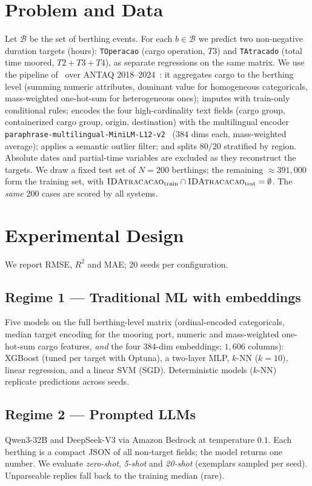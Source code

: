 \documentclass[kdmile,a4paper]{kdmile}
\begin{document}
\section{Problem and Data}
\label{sec:data}
Let $\mathcal{B}$ be the set of berthing events. For each $b\in\mathcal{B}$ we predict two non-negative duration targets (hours): \texttt{TOperacao} (cargo operation, $T3$) and \texttt{TAtracado} (total time moored, $T2{+}T3{+}T4$), as separate regressions on the same matrix. We use the pipeline of~\cite{pacheco2026pitfalls} over ANTAQ 2018--2024~\cite{antaq_data}: it aggregates cargo to the berthing level (summing numeric attributes, dominant value for homogeneous categoricals, mass-weighted one-hot-sum for heterogeneous ones); imputes with train-only conditional rules; encodes the four high-cardinality text fields (cargo group, containerized cargo group, origin, destination) with the multilingual encoder \texttt{paraphrase-\allowbreak multilingual-\allowbreak MiniLM-\allowbreak L12-v2}~\cite{reimers2019sbert} ($384$ dims each, mass-weighted average); applies a semantic outlier filter; and splits 80/20 stratified by region. Absolute dates and partial-time variables are excluded as they reconstruct the targets. We draw a fixed test set of $N{=}200$ berthings; the remaining $\approx\!391{,}000$ form the training set, with $\textsc{IDAtracacao}_{\text{train}}\cap\textsc{IDAtracacao}_{\text{test}}=\emptyset$. The \emph{same} 200 cases are scored by all systems.

\section{Experimental Design}
\label{sec:design}
We report RMSE, $R^2$ and MAE; 20 seeds per configuration.

\subsection{Regime 1 --- Traditional ML with embeddings}
Five models on the full berthing-level matrix (ordinal-encoded categoricals, median target encoding for the mooring port, numeric and mass-weighted one-hot-sum cargo features, \emph{and} the four $384$-dim embeddings; $1{,}606$ columns): XGBoost (tuned per target with Optuna), a two-layer MLP, $k$-NN ($k{=}10$), linear regression, and a linear SVM (SGD). Deterministic models ($k$-NN) replicate predictions across seeds.

\subsection{Regime 2 --- Prompted LLMs}
Qwen3-32B and DeepSeek-V3 via Amazon Bedrock at temperature $0.1$. Each berthing is a compact JSON of all non-target fields; the model returns one number. We evaluate \emph{zero-shot}, \emph{5-shot} and \emph{20-shot} (exemplars sampled per seed). Unparseable replies fall back to the training median (rare).
\end{document}
